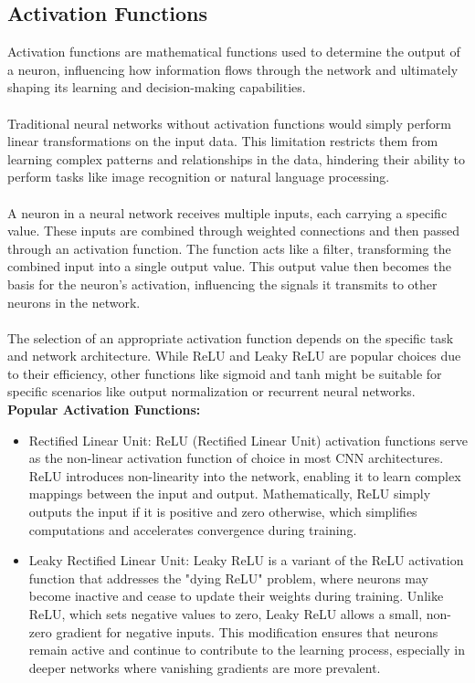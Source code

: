 \documentclass{article}
\begin{document}
\subsection{Activation Functions}
Activation functions are mathematical functions used to determine the output of a neuron, influencing how information flows through the network and ultimately shaping its learning and decision-making capabilities.\\\\
Traditional neural networks without activation functions would simply perform linear transformations on the input data. This limitation restricts them from learning complex patterns and relationships in the data, hindering their ability to perform tasks like image recognition or natural language processing.\\\\
A neuron in a neural network receives multiple inputs, each carrying a specific value. These inputs are combined through weighted connections and then passed through an activation function. The function acts like a filter, transforming the combined input into a single output value. This output value then becomes the basis for the neuron's activation, influencing the signals it transmits to other neurons in the network.\\\\
The selection of an appropriate activation function depends on the specific task and network architecture. While ReLU and Leaky ReLU are popular choices due to their efficiency, other functions like sigmoid and tanh might be suitable for specific scenarios like output normalization or recurrent neural networks.\newline\newline
\textbf{Popular Activation Functions:}\hfill\newline

\begin{itemize}
    \item[\ding{118}] Rectified Linear Unit:
          ReLU (Rectified Linear Unit) activation functions serve as the non-linear activation function of choice in most CNN architectures. ReLU introduces non-linearity into the network, enabling it to learn complex mappings between the input and output. Mathematically, ReLU simply outputs the input if it is positive and zero otherwise, which simplifies computations and accelerates convergence during training.
\end{itemize}

\begin{itemize}
    \item[\ding{118}] Leaky Rectified Linear Unit:
          Leaky ReLU is a variant of the ReLU activation function that addresses the "dying ReLU" problem, where neurons may become inactive and cease to update their weights during training. Unlike ReLU, which sets negative values to zero, Leaky ReLU allows a small, non-zero gradient for negative inputs. This modification ensures that neurons remain active and continue to contribute to the learning process, especially in deeper networks where vanishing gradients are more prevalent.
\end{itemize}
\end{document}
